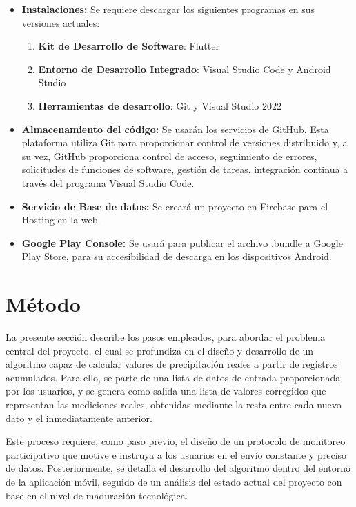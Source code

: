 \begin{itemize}
        \item \textbf{Instalaciones:} Se requiere descargar los siguientes programas en sus versiones actuales: \begin{enumerate}
        \item \textbf{Kit de Desarrollo de Software}: Flutter
        \item \textbf{Entorno de Desarrollo Integrado}: Visual Studio Code y Android Studio
        \item \textbf{Herramientas de desarrollo}: Git y Visual Studio 2022  
    \end{enumerate}
    \item \textbf{Almacenamiento del código:} Se usarán los servicios de GitHub. Esta plataforma utiliza Git para proporcionar control de versiones distribuido y, a su vez, GitHub proporciona control de acceso, seguimiento de errores, solicitudes de funciones de software, gestión de tareas, integración continua a través del programa Visual Studio Code.
    \item \textbf{Servicio de Base de datos:} Se creará un proyecto en Firebase para el Hosting en la web.
    \item \textbf{Google Play Console:} Se usará para publicar el archivo .bundle a Google Play Store, para su accesibilidad de descarga en los dispositivos Android.
\end{itemize}

\section{Método}
La presente sección describe los pasos empleados, para abordar el problema central del proyecto, el cual se profundiza en el diseño y desarrollo de un algoritmo capaz de calcular valores de precipitación reales a partir de registros acumulados. Para ello, se parte de una lista de datos de entrada proporcionada por los usuarios, y se genera como salida una lista de valores corregidos que representan las mediciones reales, obtenidas mediante la resta entre cada nuevo dato y el inmediatamente anterior.

Este proceso requiere, como paso previo, el diseño de un protocolo de monitoreo participativo que motive e instruya a los usuarios en el envío constante y preciso de datos. Posteriormente, se detalla el desarrollo del algoritmo dentro del entorno de la aplicación móvil, seguido de un análisis del estado actual del proyecto con base en el nivel de maduración tecnológica.

